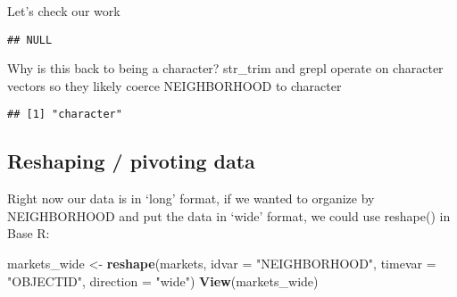 \documentclass[]{article}
\newenvironment{Shaded}{\begin{snugshade}}{\end{snugshade}}
\newcommand{\KeywordTok}[1]{\textcolor[rgb]{0.13,0.29,0.53}{\textbf{#1}}}
\newcommand{\DataTypeTok}[1]{\textcolor[rgb]{0.13,0.29,0.53}{#1}}
\newcommand{\StringTok}[1]{\textcolor[rgb]{0.31,0.60,0.02}{#1}}
\newcommand{\CommentTok}[1]{\textcolor[rgb]{0.56,0.35,0.01}{\textit{#1}}}
\newcommand{\OperatorTok}[1]{\textcolor[rgb]{0.81,0.36,0.00}{\textbf{#1}}}
\newcommand{\NormalTok}[1]{#1}
\begin{document}
Let's check our work

\begin{Shaded}
\end{Shaded}

\begin{verbatim}
## NULL
\end{verbatim}

Why is this back to being a character? str\_trim and grepl operate on
character vectors so they likely coerce NEIGHBORHOOD to character

\begin{Shaded}
\end{Shaded}

\begin{verbatim}
## [1] "character"
\end{verbatim}

\begin{Shaded}
\end{Shaded}

\subsection{Reshaping / pivoting data}\label{reshaping-pivoting-data}

Right now our data is in `long' format, if we wanted to organize by
NEIGHBORHOOD and put the data in `wide' format, we could use reshape()
in Base R:

\begin{Shaded}
\begin{Highlighting}[]
\NormalTok{markets_wide <-}\StringTok{ }\KeywordTok{reshape}\NormalTok{(markets, }\DataTypeTok{idvar =} \StringTok{"NEIGHBORHOOD"}\NormalTok{, }\DataTypeTok{timevar =} \StringTok{"OBJECTID"}\NormalTok{, }\DataTypeTok{direction =} \StringTok{"wide"}\NormalTok{)}
\KeywordTok{View}\NormalTok{(markets_wide)}
\end{Highlighting}
\end{Shaded}
\end{document}
